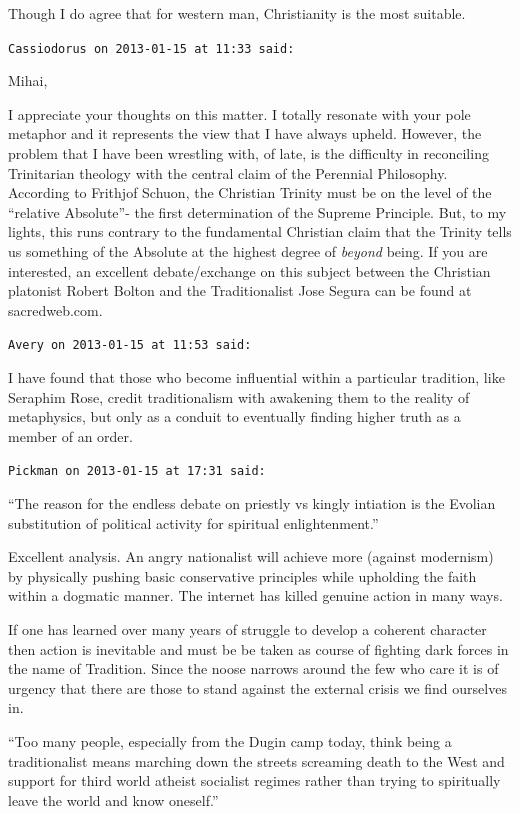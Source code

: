 \begin{footnotesize}
\begin{sffamily}
Though I do agree that for western man, Christianity is the most suitable.

\hfill

\texttt{Cassiodorus on 2013-01-15 at 11:33 said:}

Mihai,

I appreciate your thoughts on this matter. I totally resonate with your pole metaphor and it represents the view that I have always upheld. However, the problem that I have been wrestling with, of late, is the difficulty in reconciling Trinitarian theology with the central claim of the Perennial Philosophy. According to Frithjof Schuon, the Christian Trinity must be on the level of the ``relative Absolute''- the first determination of the Supreme Principle. But, to my lights, this runs contrary to the fundamental Christian claim that the Trinity tells us something of the Absolute at the highest degree of \emph{beyond} being. If you are interested, an excellent debate/exchange on this subject between the Christian platonist Robert Bolton and the Traditionalist Jose Segura can be found at sacredweb.com.

\hfill

\texttt{Avery on 2013-01-15 at 11:53 said:}

I have found that those who become influential within a particular tradition, like Seraphim Rose, credit traditionalism with awakening them to the reality of metaphysics, but only as a conduit to eventually finding higher truth as a member of an order.

\hfill

\texttt{Pickman on 2013-01-15 at 17:31 said:}

``The reason for the endless debate on priestly vs kingly intiation is the Evolian substitution of political activity for spiritual enlightenment.''

Excellent analysis. An angry nationalist will achieve more (against modernism) by physically pushing basic conservative principles while upholding the faith within a dogmatic manner. The internet has killed genuine action in many ways.

If one has learned over many years of struggle to develop a coherent character then action is inevitable and must be be taken as course of fighting dark forces in the name of Tradition. Since the noose narrows around the few who care it is of urgency that there are those to stand against the external crisis we find ourselves in.

``Too many people, especially from the Dugin camp today, think being a traditionalist means marching down the streets screaming death to the West and support for third world atheist socialist regimes rather than trying to spiritually leave the world and know oneself.''


\end{sffamily}
\end{footnotesize}
